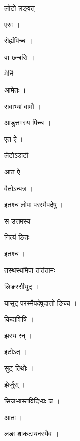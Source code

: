 \documentclass[10pt, openany, oneside]{book}
\begin{document}
\noindent लोटो लङ्वत् ।

\noindent एरुः ।

\noindent सेर्ह्यपिच्च ।

\noindent वा छन्दसि ।

\noindent मेर्निः ।

\noindent आमेतः ।

\noindent सवाभ्यां वामौ ।

\noindent आडुत्तमस्य पिच्च ।

\noindent एत ऐ ।

\noindent लेटोऽडाटौ ।

\noindent आत ऐ ।

\noindent वैतोऽन्यत्र ।

\noindent इतश्च लोपः परस्मैपदेषु ।

\noindent स उत्तमस्य ।

\noindent नित्यं ङितः ।

\noindent इतश्च ।

\noindent तस्थस्थमिपां तांतंतामः ।

\noindent लिङस्सीयुट् ।

\noindent यासुट् परस्मैपदेषूदात्तो ङिच्च ।

\noindent किदाशिषि ।

\noindent झस्य रन् ।

\noindent इटोऽत् ।

\noindent सुट् तिथोः ।

\noindent झेर्जुस् ।

\noindent सिजभ्यस्तविदिभ्यः च ।

\noindent आतः ।

\noindent लङः शाकटायनस्यैव ।
\end{document}
